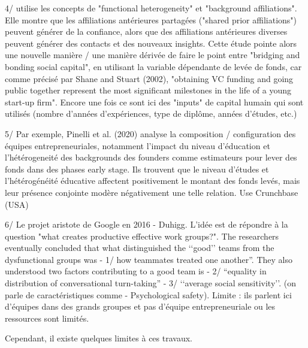 \documentclass[11pt]{article}
\begin{document}
4/ \citep{beckman2007early} utilise les concepts de "functional heterogeneity" et "background affiliations". Elle montre que les affiliations antérieures partagées ("shared prior affiliations") peuvent générer de la confiance, alors que des affiliations antérieures diverses peuvent générer des contacts et des nouveaux insights. Cette étude pointe alors une nouvelle manière / une manière dérivée de faire le point entre "bridging and bonding social capital", en utilisant la variable dépendante de levée de fonds, car comme précisé par Shane and Stuart (2002), "obtaining VC funding and going public together represent the most significant milestones in the life of a young start-up firm". Encore une fois ce sont ici des "inputs" de capital humain qui sont utilisés (nombre d'années d'expériences, type de diplôme, années d'études, etc.)

5/ Par exemple, Pinelli et al. (2020) analyse la composition / configuration des équipes entrepreneuriales, notamment l'impact du niveau d'éducation et l'hétérogeneité des backgrounds des founders comme estimateurs pour lever des fonds dans des phases early stage. Ils trouvent que le niveau d'études et l'hétérogénéité éducative affectent positivement le montant des fonds levés, mais leur présence conjointe modère négativement une telle relation. Use Crunchbase (USA)

6/ Le projet aristote de Google en 2016 - Duhigg. L'idée est de répondre à la question "what creates productive effective work groups?". The researchers eventually concluded that what distinguished the ‘‘good’’ teams from the dysfunctional groups was -	1/ how teammates treated one another”. They also understood two factors contributing to a good team is -	2/ “equality in distribution of conversational turn-taking” -	3/ ‘‘average social sensitivity’’. (on parle de caractéristiques comme -	Psychological safety). Limite : ils parlent ici d'équipes dans des grands groupes et pas d'équipe entrepreneuriale ou les ressources sont limités.

Cependant, il existe quelques limites à ces travaux.
\end{document}
